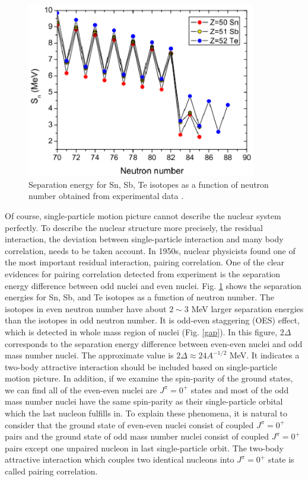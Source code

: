 \documentclass[11pt]{book} %
\begin{document}
\begin{figure}[tb]
 \begin{center}
    \includegraphics[width=100mm]{images/S_n.eps}
 \end{center}
  \caption{Separation energy for Sn, Sb, Te isotopes as a function of neutron number obtained from experimental data \cite{KJJ12}.}
  \label{S_n}
\end{figure}

Of course, single-particle motion picture cannot describe the nuclear system perfectly. To describe the nuclear structure more precisely, the residual interaction, the deviation between single-particle interaction and many body correlation, needs to be taken account. In 1950s, nuclear physicists found one of the most important residual interaction, pairing correlation. One of the clear evidences for pairing correlation detected from experiment is the separation energy difference between odd nuclei and even nuclei. Fig. \ref{S_n} shows the separation energies for Sn, Sb, and Te isotopes as a function of neutron number. The isotopes in even neutron number have about $2\sim3$ MeV larger separation energies than the isotopes in odd neutron number.
It is odd-even staggering (OES) effect, which is detected in whole mass region of nuclei (Fig. \ref{gap}). In this figure, $2\Delta$ corresponds to the separation energy difference between even-even nuclei and odd mass number nuclei. The approximate value is $2\Delta \approx 24A^{-1/2}$ MeV. It indicates a two-body attractive interaction should be included based on single-particle motion picture. In addition, if we examine the spin-parity of the ground states, we can find all of the even-even nuclei are $J^{\pi}=0^+$ states and most of the odd mass number nuclei have the same spin-parity as their single-particle orbital which the last nucleon fulfills in.
To explain these phenomena, it is natural to consider that the ground state of even-even nuclei consist of coupled $J^{\pi}=0^+$ pairs and the ground state of odd mass number nuclei consist of coupled $J^{\pi}=0^+$ pairs except one unpaired nucleon in last single-particle orbit. The two-body attractive interaction which couples two identical nucleons into $J^{\pi}=0^+$ state is called pairing correlation.
\end{document}
